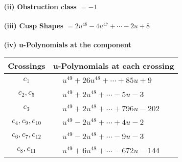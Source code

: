 \documentclass[1p]{elsarticle_modified}
\theoremstyle{definition}
\begin{document}
\flushleft \textbf{(ii) Obstruction class $= -1$}\\~\\
\flushleft \textbf{(iii) Cusp Shapes $= 2 u^{48}-4 u^{47}+\cdots-2 u+8$}\\~\\
\newpage\renewcommand{\arraystretch}{1}
\flushleft \textbf{(iv) u-Polynomials at the component}\newline \\
\begin{tabular}{m{50pt}|m{274pt}}
Crossings & \hspace{64pt}u-Polynomials at each crossing \\
\hline $$\begin{aligned}c_{1}\end{aligned}$$&$\begin{aligned}
&u^{49}+26 u^{48}+\cdots+85 u+9
\end{aligned}$\\
\hline $$\begin{aligned}c_{2},c_{5}\end{aligned}$$&$\begin{aligned}
&u^{49}+2 u^{48}+\cdots-5 u-3
\end{aligned}$\\
\hline $$\begin{aligned}c_{3}\end{aligned}$$&$\begin{aligned}
&u^{49}+2 u^{48}+\cdots+796 u-202
\end{aligned}$\\
\hline $$\begin{aligned}c_{4},c_{9},c_{10}\end{aligned}$$&$\begin{aligned}
&u^{49}-2 u^{48}+\cdots+4 u-2
\end{aligned}$\\
\hline $$\begin{aligned}c_{6},c_{7},c_{12}\end{aligned}$$&$\begin{aligned}
&u^{49}-2 u^{48}+\cdots-9 u-3
\end{aligned}$\\
\hline $$\begin{aligned}c_{8},c_{11}\end{aligned}$$&$\begin{aligned}
&u^{49}+6 u^{48}+\cdots-672 u-144
\end{aligned}$\\
\hline
\end{tabular}\\~\\
\end{document}
